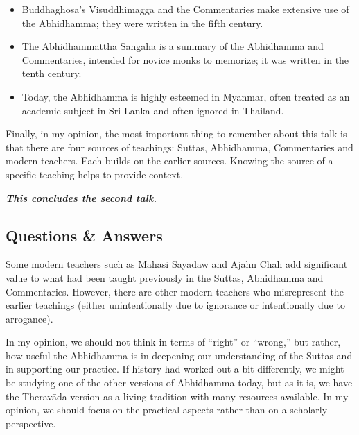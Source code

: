 \begin{itemize}
\begin{itemize}
\end{itemize}

\item Buddhaghosa’s Visuddhimagga and the Commentaries make extensive use of the Abhidhamma; they were written in the fifth century.

\item The Abhidhammattha Sangaha is a summary of the Abhidhamma and Commentaries, intended for novice monks to memorize; it was written in the tenth century.

\item Today, the Abhidhamma is highly esteemed in Myanmar, often treated as an academic subject in Sri Lanka and often ignored in Thailand.

\end{itemize}

Finally, in my opinion, the most important thing to remember about this talk is that there are four sources of teachings: Suttas, Abhidhamma, Commentaries and modern teachers. Each builds on the earlier sources. Knowing the source of a specific teaching helps to provide context.

\begin{center}
\textbf{\textit{This concludes the second talk.}} \\
\end{center}

\newpage

\subsection*{Questions \& Answers}


Some modern teachers such as Mahasi Sayadaw and Ajahn Chah add significant value to what had been taught previously in the Suttas, Abhidhamma and Commentaries. However, there are other modern teachers who misrepresent the earlier teachings (either unintentionally due to ignorance or intentionally due to arrogance). 


In my opinion, we should not think in terms of “right” or “wrong,” but rather, how useful the Abhidhamma is in deepening our understanding of the Suttas and in supporting our practice. If history had worked out a bit differently, we might be studying one of the other versions of Abhidhamma today, but as it is, we have the Theravāda version as a living tradition with many resources available. In my opinion, we should focus on the practical aspects rather than on a scholarly perspective.

